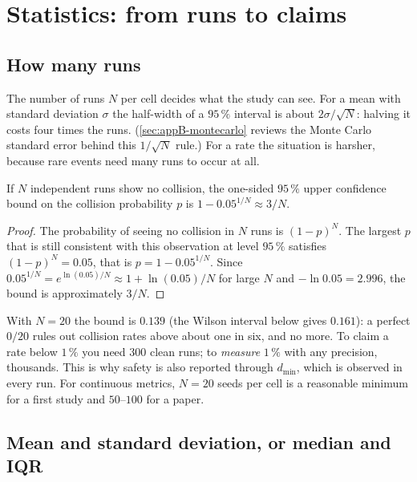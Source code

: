 \section{Statistics: from runs to claims}
\label{sec:ch25-statistics}

\subsection{How many runs}

The number of runs $N$ per cell decides what the study can see. For a mean
with standard deviation $\sigma$ the half-width of a $95\,\%$ interval is
about $2\sigma/\sqrt{N}$: halving it costs four times the runs.
(\cref{sec:appB-montecarlo} reviews the Monte Carlo standard error behind this
$1/\sqrt{N}$ rule.) For a rate
the situation is harsher, because rare events need many runs to occur at
all.

\begin{proposition}
\label{thm:ch25-three}
If $N$ independent runs show no collision, the one-sided $95\,\%$ upper
confidence bound on the collision probability $p$ is
$1 - 0.05^{1/N} \approx 3/N$.
\end{proposition}
\begin{proof}
The probability of seeing no collision in $N$ runs is $(1-p)^N$. The
largest $p$ that is still consistent with this observation at level
$95\,\%$ satisfies $(1-p)^N = 0.05$, that is $p = 1 - 0.05^{1/N}$. Since
$0.05^{1/N} = e^{\ln(0.05)/N} \approx 1 + \ln(0.05)/N$ for large $N$ and
$-\ln 0.05 = 2.996$, the bound is approximately $3/N$.
\end{proof}

With $N = 20$ the bound is $0.139$ (the Wilson interval below gives
$0.161$): a perfect $0/20$ rules out collision rates above about one in
six, and no more. To claim a rate below $1\,\%$ you need $300$ clean runs;
to \emph{measure} $1\,\%$ with any precision, thousands. This is why safety
is also reported through $d_{\min}$, which is observed in every run. For
continuous metrics, $N = 20$ seeds per cell is a reasonable minimum for a
first study and $50$--$100$ for a paper.

\subsection{Mean and standard deviation, or median and IQR}

